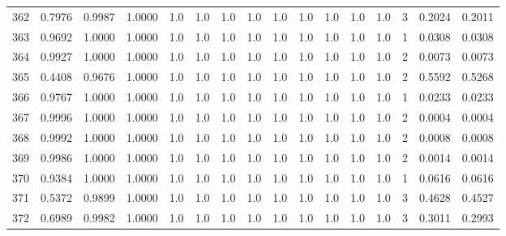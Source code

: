\begin{tabular}{lrrrrrrrrrrrrrrr}
362 &      0.7976 &  0.9987 &  1.0000 &     1.0 &     1.0 &     1.0 &     1.0 &     1.0 &     1.0 &     1.0 &      1.0 &        1.0 &      3 &                    0.2024 &                     0.2011 \\
363 &      0.9692 &  1.0000 &  1.0000 &     1.0 &     1.0 &     1.0 &     1.0 &     1.0 &     1.0 &     1.0 &      1.0 &        1.0 &      1 &                    0.0308 &                     0.0308 \\
364 &      0.9927 &  1.0000 &  1.0000 &     1.0 &     1.0 &     1.0 &     1.0 &     1.0 &     1.0 &     1.0 &      1.0 &        1.0 &      2 &                    0.0073 &                     0.0073 \\
365 &      0.4408 &  0.9676 &  1.0000 &     1.0 &     1.0 &     1.0 &     1.0 &     1.0 &     1.0 &     1.0 &      1.0 &        1.0 &      2 &                    0.5592 &                     0.5268 \\
366 &      0.9767 &  1.0000 &  1.0000 &     1.0 &     1.0 &     1.0 &     1.0 &     1.0 &     1.0 &     1.0 &      1.0 &        1.0 &      1 &                    0.0233 &                     0.0233 \\
367 &      0.9996 &  1.0000 &  1.0000 &     1.0 &     1.0 &     1.0 &     1.0 &     1.0 &     1.0 &     1.0 &      1.0 &        1.0 &      2 &                    0.0004 &                     0.0004 \\
368 &      0.9992 &  1.0000 &  1.0000 &     1.0 &     1.0 &     1.0 &     1.0 &     1.0 &     1.0 &     1.0 &      1.0 &        1.0 &      2 &                    0.0008 &                     0.0008 \\
369 &      0.9986 &  1.0000 &  1.0000 &     1.0 &     1.0 &     1.0 &     1.0 &     1.0 &     1.0 &     1.0 &      1.0 &        1.0 &      2 &                    0.0014 &                     0.0014 \\
370 &      0.9384 &  1.0000 &  1.0000 &     1.0 &     1.0 &     1.0 &     1.0 &     1.0 &     1.0 &     1.0 &      1.0 &        1.0 &      1 &                    0.0616 &                     0.0616 \\
371 &      0.5372 &  0.9899 &  1.0000 &     1.0 &     1.0 &     1.0 &     1.0 &     1.0 &     1.0 &     1.0 &      1.0 &        1.0 &      3 &                    0.4628 &                     0.4527 \\
372 &      0.6989 &  0.9982 &  1.0000 &     1.0 &     1.0 &     1.0 &     1.0 &     1.0 &     1.0 &     1.0 &      1.0 &        1.0 &      3 &                    0.3011 &                     0.2993 \\

\end{tabular}

